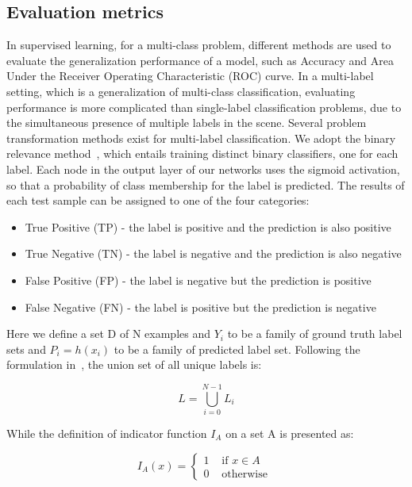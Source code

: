 \documentclass[journal]{IEEEtran}
\begin{document}
\subsection{Evaluation metrics}
\label{sec:metrics}
In supervised learning, for a multi-class problem, different methods are used to evaluate the generalization performance of a model, such as Accuracy and Area Under the Receiver Operating Characteristic (ROC) curve. In a multi-label setting, which is a generalization of multi-class classification, evaluating performance is more complicated than single-label classification problems, due to the simultaneous presence of multiple labels in the scene. Several problem transformation methods exist for multi-label classification. We adopt the binary relevance method~\citep{2011}, which entails training distinct binary classifiers, one for each label.
Each node in the output layer of our networks uses the sigmoid activation, so that a probability of class membership for the label is predicted. The results of each test sample can be assigned to one of the four categories:

\begin{itemize}
    \item True Positive (TP) - the label is positive and the prediction is also positive
    \item True Negative (TN) - the label is negative and the prediction is also negative
    \item False Positive (FP) - the label is negative but the prediction is positive
    \item False Negative (FN) - the label is positive but the prediction is negative
\end{itemize}

Here we define a set D of N examples and $Y_{i}$ to be a family of ground truth label sets and $P_{i}=h\left(x_{i}\right)$ to be a family of predicted label set. Following the formulation in~\cite{6471714}, the union set of all unique labels is:

\begin{equation}
L=\bigcup_{i=0}^{N-1} L_{i}
\end{equation}

While the definition of indicator function $I_{A}$ on a set A is presented as:

\begin{equation}
I_{A}(x)= \begin{cases}1 & \text { if } x \in A \\ 0 & \text { otherwise }\end{cases}
\end{equation}
\end{document}
